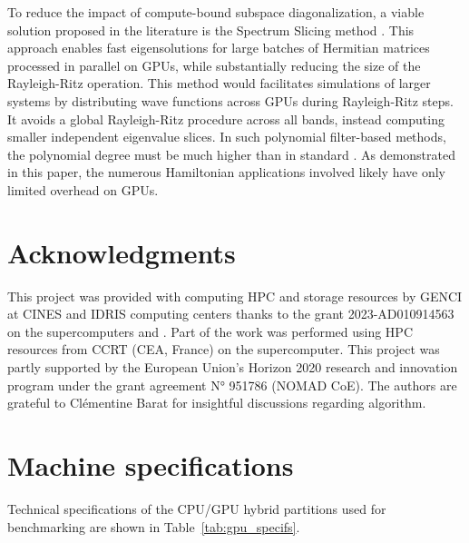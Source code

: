 \documentclass[twocolumn,superscriptaddress]{revtex4-1}
\begin{document}
To reduce the impact of compute-bound subspace diagonalization, a viable solution proposed in the literature is the Spectrum Slicing method \cite{LIOU2020107330,SCHOFIELD2012497}. This approach enables fast eigensolutions for large batches of Hermitian matrices processed in parallel on GPUs, while substantially reducing the size of the Rayleigh-Ritz operation.
This method would facilitates simulations of larger systems by distributing wave functions across GPUs during Rayleigh-Ritz steps. It avoids a global Rayleigh-Ritz procedure across all bands, instead computing smaller independent eigenvalue slices. In such polynomial filter-based methods, the polynomial degree must be much higher than in standard \chebyshevfiltering. As demonstrated in this paper, the numerous Hamiltonian applications involved likely have only limited overhead on GPUs.


\section*{Acknowledgments}

This project was provided with computing HPC and storage resources by GENCI at CINES and IDRIS computing centers thanks to the grant 2023-AD010914563 on the supercomputers \jeanzay and \adastra.
Part of the work was performed using HPC resources from CCRT (CEA, France) on the \topaze supercomputer.
This project was partly supported by the European Union’s Horizon 2020 research and innovation program under the grant agreement N° 951786 (NOMAD CoE).
The authors are grateful to Cl\'ementine Barat for insightful discussions regarding \chebyshevfiltering algorithm.





\appendix

\section{Machine specifications} \label{sec:gpu_specifs}

Technical specifications of the CPU/GPU hybrid partitions used for benchmarking are shown in Table~\ref{tab:gpu_specifs}.
\end{document}
